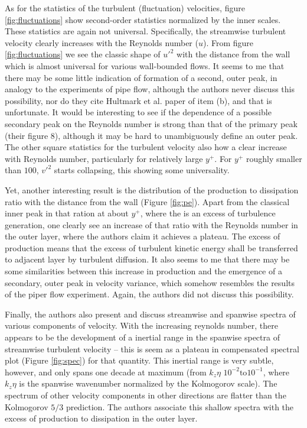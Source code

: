 \documentclass[11pt]{article}
\begin{document}
\begin{enumerate}[label=(\alph*)]
        As for the statistics of the turbulent (fluctuation) velocities, figure \ref{fig:fluctuations} show
        second-order statistics normalized by the inner scales. These statistics are again not universal.
        Specifically, the streamwise turbulent velocity clearly increases with the Reynolds number 
        ($u$). From  figure \eqref{fig:fluctuations} we see the classic shape of $u'^2$ with the distance
        from the wall which is almost universal for various wall-bounded flows.
        It seems to me that there may be
        some little indication of formation of a second, outer peak, in analogy to the experiments of 
        pipe flow, although the authors never discuss this possibility, nor do they cite Hultmark et al.
        paper of item (b), and that is unfortunate. It would be interesting to see if the dependence of 
        a possible secondary peak on the Reynolds number is strong than that of the primary peak
        (their figure 8), although it may be hard to unambiguously define an outer peak. The other
        square statistics for the turbulent velocity also how a clear increase with Reynolds number,
        particularly for relatively large $y^+$. For $y^+$ roughly smaller than  $100$, $v'^2$ starts
        collapsing, this showing some universality. 

        Yet, another interesting result is the distribution of the production to dissipation ratio
        with the distance from the wall (Figure \ref{fig:pe}). Apart from the classical inner
        peak in that ration at about $y^+$, where the is an excess of turbulence generation, one
        clearly see an increase of that ratio with the Reynolds number in the outer layer, where
        the authors claim it achieves a plateau. The excess of production means that the excess
        of turbulent kinetic energy shall be transferred to adjacent layer by turbulent diffusion.
        It also seems to me that there may be some similarities between this increase in production
        and the emergence of a secondary, outer peak in velocity variance, which somehow resembles
        the results of the piper flow experiment. Again, the authors did not discuss this possibility.

        Finally, the authors also present and discuss streamwise and spanwise spectra of various 
        components of velocity. With the increasing reynolds number, there appears to be the 
        development of a inertial range in the spanwise spectra of streamwise turbulent velocity –
        this is seem as a plateau in compensated spectral plot (Figure \ref{fig:spec}) for that quantity. This
         inertial range is very subtle, however, and only spans one decade at maximum (from $k_z \eta$
         $10^{-2} \text{to} 10^{-1}$, where $k_z\eta$ is the spanwise wavenumber normalized by the Kolmogorov
         scale). The spectrum of other velocity components in other directions are flatter than the 
         Kolmogorov $5/3$ prediction. The authors associate this shallow spectra with the excess of
         production to dissipation in the outer layer.



\end{enumerate}
\end{document}
